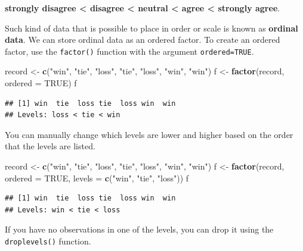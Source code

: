 \documentclass[
]{book}
\newenvironment{Shaded}{\begin{snugshade}}{\end{snugshade}}
\newcommand{\DataTypeTok}[1]{\textcolor[rgb]{0.13,0.29,0.53}{#1}}
\newcommand{\KeywordTok}[1]{\textcolor[rgb]{0.13,0.29,0.53}{\textbf{#1}}}
\newcommand{\NormalTok}[1]{#1}
\newcommand{\OtherTok}[1]{\textcolor[rgb]{0.56,0.35,0.01}{#1}}
\newcommand{\StringTok}[1]{\textcolor[rgb]{0.31,0.60,0.02}{#1}}
\begin{document}
\textbf{strongly disagree \textless{} disagree \textless{} neutral \textless{} agree \textless{} strongly agree}.

Such kind of data that is possible to place in order or scale is known as \textbf{ordinal data}. We can store ordinal data as an ordered factor. To create an ordered factor, use the \texttt{factor()} function with the argument \texttt{ordered=TRUE}.

\begin{Shaded}
\begin{Highlighting}[]
\NormalTok{record <-}\StringTok{ }\KeywordTok{c}\NormalTok{(}\StringTok{"win"}\NormalTok{, }\StringTok{"tie"}\NormalTok{, }\StringTok{"loss"}\NormalTok{, }\StringTok{"tie"}\NormalTok{, }\StringTok{"loss"}\NormalTok{, }\StringTok{"win"}\NormalTok{, }\StringTok{"win"}\NormalTok{)}
\NormalTok{f <-}\StringTok{ }\KeywordTok{factor}\NormalTok{(record, }\DataTypeTok{ordered =} \OtherTok{TRUE}\NormalTok{)}
\NormalTok{f}
\end{Highlighting}
\end{Shaded}

\begin{verbatim}
## [1] win  tie  loss tie  loss win  win 
## Levels: loss < tie < win
\end{verbatim}

You can manually change which levels are lower and higher based on the order that the levels are listed.

\begin{Shaded}
\begin{Highlighting}[]
\NormalTok{record <-}\StringTok{ }\KeywordTok{c}\NormalTok{(}\StringTok{"win"}\NormalTok{, }\StringTok{"tie"}\NormalTok{, }\StringTok{"loss"}\NormalTok{, }\StringTok{"tie"}\NormalTok{, }\StringTok{"loss"}\NormalTok{, }\StringTok{"win"}\NormalTok{, }\StringTok{"win"}\NormalTok{)}
\NormalTok{f <-}\StringTok{ }\KeywordTok{factor}\NormalTok{(record, }\DataTypeTok{ordered =} \OtherTok{TRUE}\NormalTok{, }\DataTypeTok{levels =} \KeywordTok{c}\NormalTok{(}\StringTok{"win"}\NormalTok{, }\StringTok{"tie"}\NormalTok{,}
    \StringTok{"loss"}\NormalTok{))}
\NormalTok{f}
\end{Highlighting}
\end{Shaded}

\begin{verbatim}
## [1] win  tie  loss tie  loss win  win 
## Levels: win < tie < loss
\end{verbatim}

If you have no observations in one of the levels, you can drop it using the \texttt{droplevels()} function.
\end{document}
